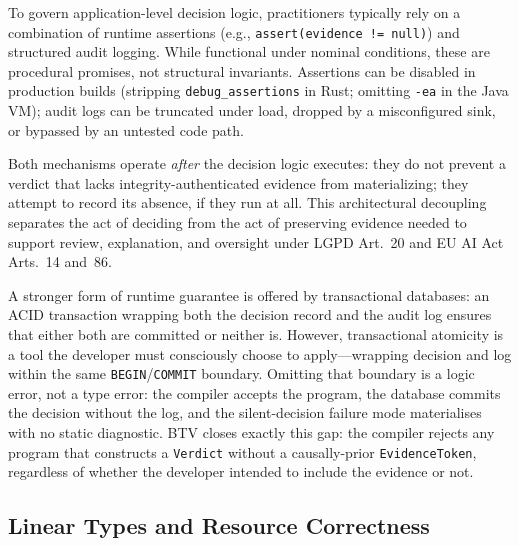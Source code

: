 To govern application-level decision logic, practitioners
typically rely on a combination of runtime assertions
(e.g., \texttt{assert(evidence != null)}) and structured
audit logging.
While functional under nominal conditions, these are procedural
promises, not structural invariants.
Assertions can be disabled in production builds (stripping
\texttt{debug\_assertions} in Rust; omitting \texttt{-ea} in the
Java VM); audit logs can be truncated under load, dropped by a
misconfigured sink, or bypassed by an untested code path.

Both mechanisms operate \emph{after} the decision logic executes:
they do not prevent a verdict that lacks integrity-authenticated
evidence from materializing; they attempt to record its absence, if
they run at all.
This architectural decoupling separates the act of deciding from the
act of preserving evidence needed to support review, explanation, and
oversight under LGPD Art.~20 and EU AI Act Arts.~14 and~86.

A stronger form of runtime guarantee is offered by transactional
databases: an ACID transaction wrapping both the decision record and
the audit log ensures that either both are committed or neither is.
However, transactional atomicity is a tool the developer must
consciously choose to apply---wrapping decision and log within the
same \texttt{BEGIN}/\texttt{COMMIT} boundary.
Omitting that boundary is a logic error, not a type error: the
compiler accepts the program, the database commits the decision
without the log, and the silent-decision failure mode materialises
with no static diagnostic.
BTV closes exactly this gap: the compiler rejects any program that
constructs a \texttt{Verdict} without a causally-prior
\texttt{EvidenceToken}, regardless of whether the developer intended
to include the evidence or not.

\subsection{Linear Types and Resource Correctness}
\label{sec:linear_related}

